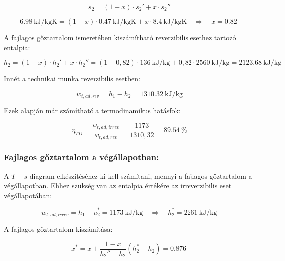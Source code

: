 \begin{equation}
	s_2 = (1-x) \cdot s_2' + x \cdot s_2''
\end{equation}

\begin{equation}
	\SI {6.98}{\kilo\joule\per\kilogram\kelvin} = (1-x)\cdot \SI{0.47}{\kilo\joule\per\kilogram\kelvin} + x \cdot \SI{8.4}{\kilo\joule\per\kilogram\kelvin}
	\quad 
	\Rightarrow
	\quad
	x = \SI{0.82}{}
\end{equation}

\noindent A fajlagos gőztartalom ismeretében kiszámítható reverzibilis esethez tartozó entalpia:

\begin{equation}
	h_2 =  (1-x)\cdot h_2' + x\cdot h_2'' = (1-0,82)\cdot \SI{136}{\kilo\joule\per\kilogram} + 0,82 \cdot \SI{2560}{\kilo\joule\per\kilogram} = \SI{2123.68}{\kilo\joule\per\kilogram}	
\end{equation}

\noindent Innét a technikai munka reverzibilis esetben:

\begin{equation}
	w_{t,ad,rev} = h_1- h_2 = \SI{1310.32}{\kilo\joule\per\kilogram}
\end{equation}

\noindent Ezek alapján már számítható a termodinamikus hatásfok:

\begin{equation}
	\eta_{TD} = \dfrac {w_{t,ad,irrev}}{w_{t,ad,rev}} = \dfrac {1173}{1310,32} = \SI{89.54}{\percent}
\end{equation}

\subsubsection{Fajlagos gőztartalom a végállapotban:} 
A $T-s$ diagram elkészítéséhez ki kell számítani, mennyi a fajlagos gőztartalom a végállapotban. Ehhez szükség van az entalpia értékére az irreverzibilis eset végállapotában:

\begin{equation}
w_{t,ad,irrev} = h_1- h_2^* = \SI{1173}{\kilo\joule\per\kilogram}
\quad 
\Rightarrow
\quad
h_2^*=\SI{2261}{\kilo\joule\per\kilogram}
\end{equation}

\noindent A fajlagos gőztartalom kiszámítása:

\begin{equation}
x^* = x + \dfrac {1-x}{h_2''-h_2}(h_2^*-h_2) =\SI{0.876}{}
\end{equation}

